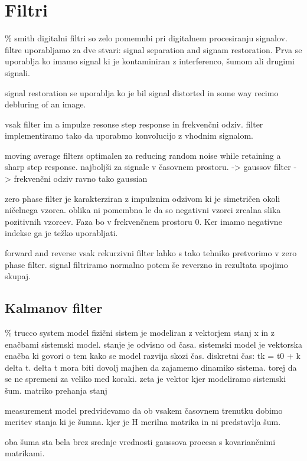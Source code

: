 \section{Filtri}\label{sec:filtri}
\% smith
digitalni filtri so zelo pomemnbi pri digitalnem procesiranju signalov. filtre uporabljamo za dve stvari: signal separation and signam restoration. Prva se uporablja ko imamo signal ki je kontaminiran z interferenco, šumom ali drugimi signali. 

signal restoration se uporablja ko je bil signal distorted in some way recimo debluring of an image.

vsak filter im a impulze resonse step response in frekvenčni odziv. filter implementiramo tako da uporabmo konvolucijo z vhodnim signalom. 

moving average filters
optimalen za reducing random noise while retaining a sharp step response. najboljši za signale v časovnem prostoru.  -> gaussov filter -> frekvenčni odziv ravno tako gaussian  

zero phase filter
je karakterziran z impulznim odzivom ki je simetričen okoli ničelnega vzorca. oblika ni pomembna le da so negativni vzorci zrcalna slika pozitivnih vzorcev. Faza bo v frekvenčnem prostoru 0. Ker imamo negativne indekse ga je težko uporabljati. 

forward and reverse
vsak rekurzivni filter lahko s tako tehniko pretvorimo v zero phase filter. signal filtriramo normalno potem še reverzno in rezultata spojimo skupaj. 







\subsection{Kalmanov filter}\label{sec:kalmanov-filter}
\% trucco
system model
fizični sistem je modeliran z vektorjem stanj x in z enačbami sistemski model. stanje je odvisno od časa. sistemski model je vektorska enačba ki govori o tem kako se model razvija skozi čas. diskretni čas: tk = t0 + k delta t. delta t mora biti dovolj majhen da zajamemo dinamiko sistema. torej da se ne spremeni za veliko med koraki. zeta je vektor kjer modeliramo sistemski šum. matriko prehanja stanj 

measurement model
predvidevamo da ob vsakem časovnem trenutku dobimo meritev stanja ki je šumna. 
kjer je H merilna matrika in ni predstavlja šum. 

oba šuma sta bela brez srednje vrednosti gaussova procesa s kovariančnimi matrikami. 

